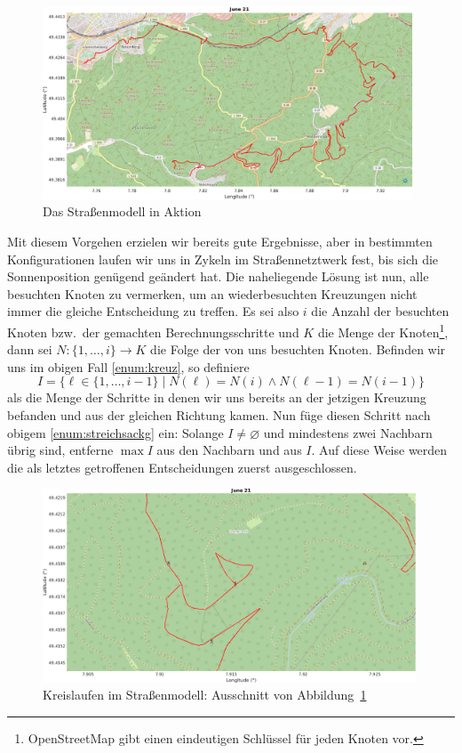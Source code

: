 \documentclass[
    paper=a4,
    DIV14,
    fontsize=12pt,
    pagesize=pdftex,
    toc=bibliographynumbered
]{scrartcl}
\numberwithin{figure}{section}
\numberwithin{equation}{section}
\numberwithin{table}{section}
\begin{document}
\begin{figure}[htb]
    \centering
    \includegraphics[width=0.98\textwidth]{images/tukl_strasse_gross.png}
    \caption{Das Straßenmodell in Aktion}
    \label{fig:osmmod}
\end{figure}

Mit diesem Vorgehen erzielen wir bereits gute Ergebnisse, aber in bestimmten
Konfigurationen laufen wir uns in Zykeln im Straßennetztwerk fest, bis sich die
Sonnenposition genügend geändert hat. Die naheliegende Lösung ist nun, alle besuchten
Knoten zu vermerken, um an wiederbesuchten Kreuzungen nicht immer die gleiche Entscheidung
zu treffen. Es sei also $i$ die Anzahl der besuchten Knoten bzw.\ der gemachten
Berechnungsschritte und $K$ die Menge der Knoten\footnote{OpenStreetMap gibt einen
eindeutigen Schlüssel für jeden Knoten vor.}, dann sei $N:\{1, \dots, i\} \to K$ die Folge
der von uns besuchten Knoten. Befinden wir uns im obigen Fall \ref{enum:kreuz}, so
definiere
\begin{equation*}
    I = \bigl\{ \ell \in \{1, \dots, i-1\} \mid
    N(\ell) = N(i) \wedge N(\ell-1) = N(i-1) \bigr\}
\end{equation*}
als die Menge der Schritte in denen wir uns bereits an der jetzigen Kreuzung befanden und
aus der gleichen Richtung kamen. Nun füge diesen Schritt nach obigem
\ref{enum:streichsackg} ein: Solange $I\neq\varnothing$ und mindestens zwei Nachbarn übrig
sind, entferne $\max I$ aus den Nachbarn und aus $I$. Auf diese Weise werden die als
letztes getroffenen Entscheidungen zuerst ausgeschlossen.

\begin{figure}[htb]
    \centering
    \includegraphics[width=0.99\textwidth]{images/tuklzykel.png}
    \caption{Kreislaufen im Straßenmodell: Ausschnitt von Abbildung~\ref{fig:osmmod}}
    \label{fig:osmzyk}
\end{figure}
\end{document}
